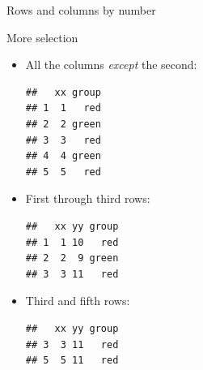 \begin{frame}[fragile]{Rows and columns by number}
\begin{multicols}{2}
\begin{itemize}
  
    
  \end{itemize}
    
  \end{multicols}
  
\end{frame}

\begin{frame}[fragile]{More selection}
  
  \begin{multicols}{2}
  \begin{itemize}
\item All the columns \emph{except} the second:
  
 
\begin{knitrout}
\color{fgcolor}\begin{kframe}
\begin{alltt}
\hlstd{my.data[,}\hlopt{-}\hlstd{]}
\end{alltt}
\begin{verbatim}
##   xx group
## 1  1   red
## 2  2 green
## 3  3   red
## 4  4 green
## 5  5   red
\end{verbatim}
\end{kframe}
\end{knitrout}

\item First through third rows:
  
 
\begin{knitrout}
\color{fgcolor}\begin{kframe}
\begin{alltt}
\hlstd{my.data[}\hlopt{:}\hlstd{,]}
\end{alltt}
\begin{verbatim}
##   xx yy group
## 1  1 10   red
## 2  2  9 green
## 3  3 11   red
\end{verbatim}
\end{kframe}
\end{knitrout}

\item Third and fifth rows:
  
 
\begin{knitrout}
\color{fgcolor}\begin{kframe}
\begin{alltt}
\hlstd{my.data[}\hlstd{(}\hlstd{,}\hlstd{),]}
\end{alltt}
\begin{verbatim}
##   xx yy group
## 3  3 11   red
## 5  5 11   red
\end{verbatim}
\end{kframe}
\end{knitrout}
  

\end{itemize}
    
  \end{multicols}
  
\end{frame}



